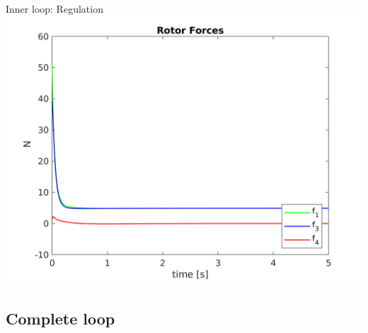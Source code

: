 \begin{frame}[fragile]{Inner loop: Regulation}
    \includegraphics[width=\textwidth]{../report/Images/Forcesinner}
\end{frame}


\subsection{Complete loop}



